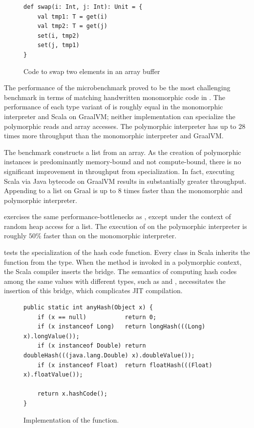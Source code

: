 \begin{figure}[!htb]
\begin{verbatim}
def swap(i: Int, j: Int): Unit = {
	val tmp1: T = get(i)
	val tmp2: T = get(j)
	set(i, tmp2)
	set(j, tmp1)
}
\end{verbatim}
\caption{Code to swap two elements in an array buffer}
\label{impl:swap}
\end{figure}

The performance of the  microbenchmark proved to be the most challenging benchmark in terms of matching handwritten monomorphic code in \cite{scala:miniboxing}.
The performance of each type variant of  is roughly equal in the monomorphic interpreter and Scala on GraalVM; neither implementation can specialize the polymorphic reads and array accesses.
The polymorphic interpreter has up to $28$ times more throughput than the monomorphic interpreter and GraalVM.

The  benchmark constructs a list from an array.
As the creation of polymorphic instances is predominantly memory-bound and not compute-bound, there is no significant improvement in throughput from specialization.
In fact, executing Scala via Java bytecode on GraalVM results in substantially greater throughput.
Appending to a list on Graal is up to $8$ times faster than the monomorphic and polymorphic interpreter.

 exercises the same performance-bottlenecks as , except under the context of random heap access for a list.
The execution of  on the polymorphic interpreter is roughly $50\%$ faster than on the monomorphic interpreter.

 tests the specialization of the hash code function.
Every class in Scala inherits the  function from the  type.
When the  method is invoked in a polymorphic context, the Scala compiler inserts the  bridge.
The semantics of computing hash codes among the same values with different types, such as  and , necessitates the insertion of this bridge, which complicates JIT compilation.

\begin{figure}[!htb]
\begin{verbatim}
public static int anyHash(Object x) {
	if (x == null)           return 0;
	if (x instanceof Long)   return longHash(((Long) x).longValue());
	if (x instanceof Double) return doubleHash(((java.lang.Double) x).doubleValue());
	if (x instanceof Float)  return floatHash(((Float) x).floatValue());
	
	return x.hashCode();
}
\end{verbatim}
\caption{Implementation of the  function.}
\label{impl:anyHash}
\end{figure}

